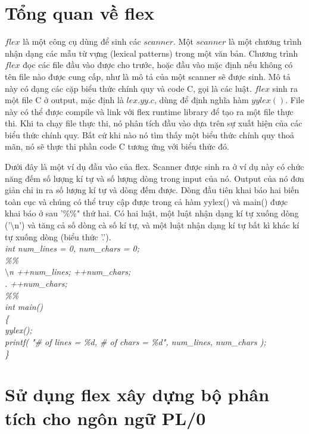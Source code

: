 \documentclass[14pt,a4paper]{extreport}
\begin{document}
\section{Tổng quan về flex}
$ flex $ là một công cụ dùng để sinh các $ scanner $. Một $ scanner $ là một chương trình nhận dạng các mẫu từ vựng (lexical patterns) trong một văn bản. Chương trình $ flex $ đọc các file đầu vào được cho trước, hoặc đầu vào mặc định nếu không có tên file nào được cung cấp, như là mô tả của một scanner sẽ được sinh. Mô tả này có dạng các cặp biểu thức chính quy và code C, gọi là các luật. $ flex $ sinh ra một file C ở output, mặc định là $ lex.yy.c $, dùng để định nghĩa hàm $ yylex() $. File này có thể được compile và link với flex runtime library để tạo ra một file thực thi. Khi ta chạy file thực thi, nó phân tích đầu vào dựa trên sự xuất hiện của các biểu thức chính quy. Bất cứ khi nào nó tìm thấy một biểu thức chính quy thoả mãn, nó sẽ thực thi phần code C tương ứng với biểu thức đó. 

Dưới đây là một ví dụ đầu vào của flex. Scanner được sinh ra ở ví dụ này có chức năng đếm số lượng kí tự và số lượng dòng trong input của nó. Output của nó đơn giản chỉ in ra số lượng kí tự và dòng đếm được. Dòng đầu tiên khai báo hai biến toàn cục và chúng có thể truy cập được trong cả hàm yylex() và main() được khai báo ở sau '\%\%" thứ hai. Có hai luật, một luật nhận dạng kí tự xuống dòng ('$ \setminus$n') và tăng cả số dòng cà số kí tự, và một luật nhận dạng kí tự bất kì khác kí tự xuống dòng (biểu thức '.').\\

\textit{ int num\_lines = 0, num\_chars = 0;\\
    \%\% \\
$ \setminus$n  \hspace{1cm}     ++num\_lines; ++num\_chars;\\
.  \hspace{1.4cm}     ++num\_chars; \\
\%\% \\
int main() \\
\{\\
	yylex();\\
	printf( "\# of lines = \%d, \# of chars = \%d", num\_lines, num\_chars );\\
\}}\\




\section{Sử dụng flex xây dựng bộ phân tích cho ngôn ngữ PL/0}
\end{document}
